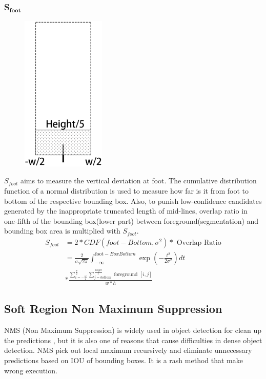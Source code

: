 \documentclass[journal]{IEEEtran}
\begin{document}
\subsubsection{S$_{\textbf{foot}}$}
\begin{figure}[htb]
    \includegraphics[height=7.5cm]{fig/sfootBox.eps}
    \caption{}
    \label{}
\end{figure}

$S_{foot}$ aims to measure the vertical deviation at foot.
The cumulative distribution function of a normal distribution is used to measure how far is it from foot to bottom of the respective bounding box. Also, to punish low-confidence candidates generated by the inappropriate truncated length of mid-lines, overlap ratio in one-fifth of the bounding box(lower part) between foreground(segmentation) and bounding box area is multiplied with $S_{foot}$.
$$
    \begin{aligned} S_{f o o t} &=2 * C D F\left(f o o t-B o t t o m, \sigma^{2}\right) * \text { Overlap Ratio} \\ &=\frac{2}{\sigma \sqrt{2 \pi}} \int_{-\infty}^{\text {foot}-B o x B o t t o m} \exp \left(-\frac{t^{2}}{2 \sigma^{2}}\right) d t \\ & * \frac{\sum_{i=-\frac{w}{2}}^{\frac{w}{2}} \sum_{j=bottom}^{\frac{height}{5}} \text { foreground }[i, j]}{w * h} \end{aligned}
$$
\subsection{Soft Region Non Maximum Suppression}
NMS (Non Maximum Suppression) is widely used in object detection for clean up the predictions , but it is also one of reasons that cause difficulties in dense object detection. NMS pick out local maximum recursively and eliminate unnecessary predictions based on IOU of bounding boxes. It is a rash method that make wrong execution.
\end{document}
